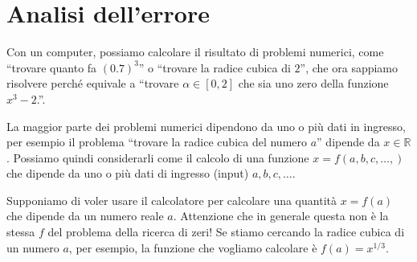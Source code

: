 \documentclass[a4paper]{report}
\theoremstyle{definiton}
\theoremstyle{remark}
\begin{document}
\chapter{Analisi dell'errore}

Con un computer, possiamo calcolare il risultato di problemi numerici, come ``trovare quanto fa $(0.7)^3$'' o ``trovare la radice cubica di $2$'', che ora sappiamo risolvere perché equivale a ``trovare $\alpha\in [0,2]$ che sia uno zero della funzione $x^3-2$.''.

La maggior parte dei problemi numerici dipendono da uno o più dati in ingresso, per esempio il problema ``trovare la radice cubica del numero $a$'' dipende da $x\in\mathbb{R}$. Possiamo quindi considerarli come il calcolo di una funzione $x = f(a,b,c,\dots,)$ che dipende da uno o più dati di ingresso (input) $a,b,c,\dots$.

Supponiamo di voler usare il calcolatore per calcolare una quantità $x = f(a)$ che dipende da un numero reale $a$. Attenzione che in generale questa non è la stessa $f$ del problema della ricerca di zeri! Se stiamo cercando la radice cubica di un numero $a$, per esempio, la funzione che vogliamo calcolare è $f(a) = x^{1/3}$.
\end{document}
